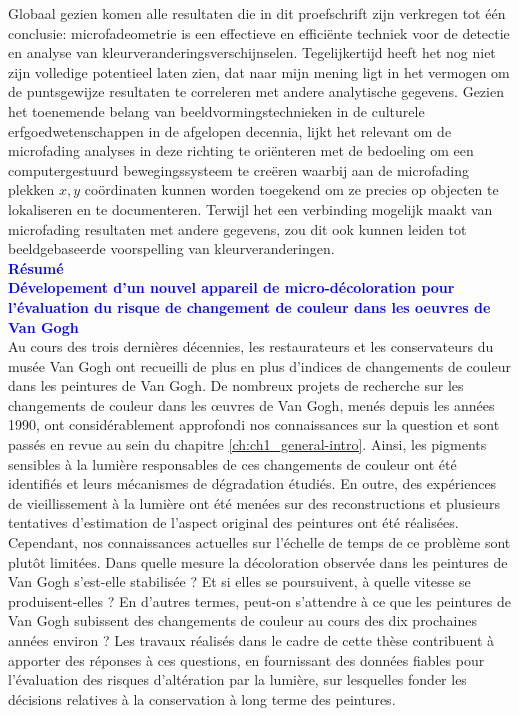 Globaal gezien komen alle resultaten die in dit proefschrift zijn verkregen tot één conclusie: microfadeometrie is een effectieve en efficiënte techniek voor de detectie en analyse van kleurveranderingsverschijnselen. Tegelijkertijd heeft het nog niet zijn volledige potentieel laten zien, dat naar mijn mening ligt in het vermogen om de puntsgewijze resultaten te correleren met andere analytische gegevens. Gezien het toenemende belang van beeldvormingstechnieken in de culturele erfgoedwetenschappen in de afgelopen decennia, lijkt het relevant om de microfading analyses in deze richting te oriënteren met de bedoeling om een computergestuurd bewegingssysteem te creëren waarbij aan de microfading plekken $x,y$ coördinaten kunnen worden toegekend om ze precies op objecten te lokaliseren en te documenteren. Terwijl het een verbinding mogelijk maakt van microfading resultaten met andere gegevens, zou dit ook kunnen leiden tot beeldgebaseerde voorspelling van kleurveranderingen.\\



\newpage
\textbf{\textcolor{blue}{\LARGE Résumé}}\\

\textbf{\textcolor{blue}{Dévelopement d'un nouvel appareil de micro-décoloration pour l'évaluation du risque de changement de couleur dans les oeuvres de Van Gogh}}\\

Au cours des trois dernières décennies, les restaurateurs et les conservateurs du musée Van Gogh ont recueilli de plus en plus d'indices de changements de couleur dans les peintures de Van Gogh. De nombreux projets de recherche sur les changements de couleur dans les œuvres de Van Gogh, menés depuis les années 1990, ont considérablement approfondi nos connaissances sur la question et sont passés en revue au sein du chapitre \ref{ch:ch1_general-intro}. Ainsi, les pigments sensibles à la lumière responsables de ces changements de couleur ont été identifiés et leurs mécanismes de dégradation étudiés. En outre, des expériences de vieillissement à la lumière ont été menées sur des reconstructions et plusieurs tentatives d'estimation de l'aspect original des peintures ont été réalisées. Cependant, nos connaissances actuelles sur l'échelle de temps de ce problème sont plutôt limitées. Dans quelle mesure la décoloration observée dans les peintures de Van Gogh s'est-elle stabilisée ? Et si elles se poursuivent, à quelle vitesse se produisent-elles ? En d'autres termes, peut-on s'attendre à ce que les peintures de Van Gogh subissent des changements de couleur au cours des dix prochaines années environ ? Les travaux réalisés dans le cadre de cette thèse contribuent à apporter des réponses à ces questions, en fournissant des données fiables pour l'évaluation des risques d'altération par la lumière, sur lesquelles fonder les décisions relatives à la conservation à long terme des peintures. \\

